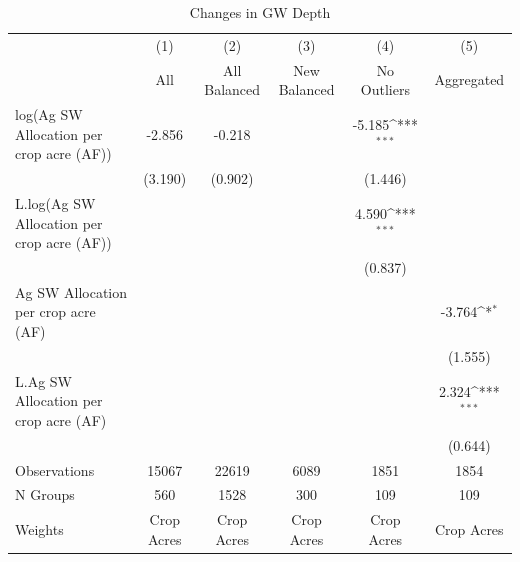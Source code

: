 \begin{table}[htbp]\centering
\def\sym#1{\ifmmode^{#1}\else\(^{#1}\)\fi}
\caption{Changes in GW Depth}
\begin{tabular}{l*{5}{c}}
\hline\hline
                    &\multicolumn{1}{c}{(1)}&\multicolumn{1}{c}{(2)}&\multicolumn{1}{c}{(3)}&\multicolumn{1}{c}{(4)}&\multicolumn{1}{c}{(5)}\\
                    &\multicolumn{1}{c}{All}&\multicolumn{1}{c}{All Balanced}&\multicolumn{1}{c}{New Balanced}&\multicolumn{1}{c}{No Outliers}&\multicolumn{1}{c}{Aggregated}\\
\hline
log(Ag SW Allocation per crop acre (AF))&      -2.856         &      -0.218         &                     &      -5.185\sym{***}&                     \\
                    &     (3.190)         &     (0.902)         &                     &     (1.446)         &                     \\
[1em]
L.log(Ag SW Allocation per crop acre (AF))&                     &                     &                     &       4.590\sym{***}&                     \\
                    &                     &                     &                     &     (0.837)         &                     \\
[1em]
Ag SW Allocation per crop acre (AF)&                     &                     &                     &                     &      -3.764\sym{*}  \\
                    &                     &                     &                     &                     &     (1.555)         \\
[1em]
L.Ag SW Allocation per crop acre (AF)&                     &                     &                     &                     &       2.324\sym{***}\\
                    &                     &                     &                     &                     &     (0.644)         \\
\hline
Observations        &       15067         &       22619         &        6089         &        1851         &        1854         \\
N Groups            &         560         &        1528         &         300         &         109         &         109         \\
Weights             &  Crop Acres         &  Crop Acres         &  Crop Acres         &  Crop Acres         &  Crop Acres         \\

\end{tabular}
\end{table}
